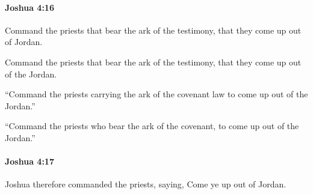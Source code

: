		\paragraph{Joshua 4:16} %
			\label{JOSHUA-4-16}

			Command the priests that bear the ark of the testimony, that they come up out of Jordan.

			\begin{versebox}
					\item[BHS] 
					\item[ASV] Command the priests that bear the ark of the testimony, that they come up out of the Jordan.
					\item[NIV] “Command the priests carrying the ark of the covenant law to come up out of the Jordan.”
					\item[NRSV] “Command the priests who bear the ark of the covenant, to come up out of the Jordan.”
			\end{versebox}

		\paragraph{Joshua 4:17} %
			\label{JOSHUA-4-17}

			Joshua therefore commanded the priests, saying, Come ye up out of Jordan.

